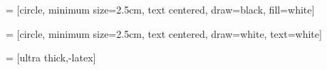  = [circle,
minimum size=2.5cm,
text centered,
draw=black,
fill=white]

 = [circle,
minimum size=2.5cm,
text centered,
draw=white,
text=white]





 = [ultra thick,-latex]


